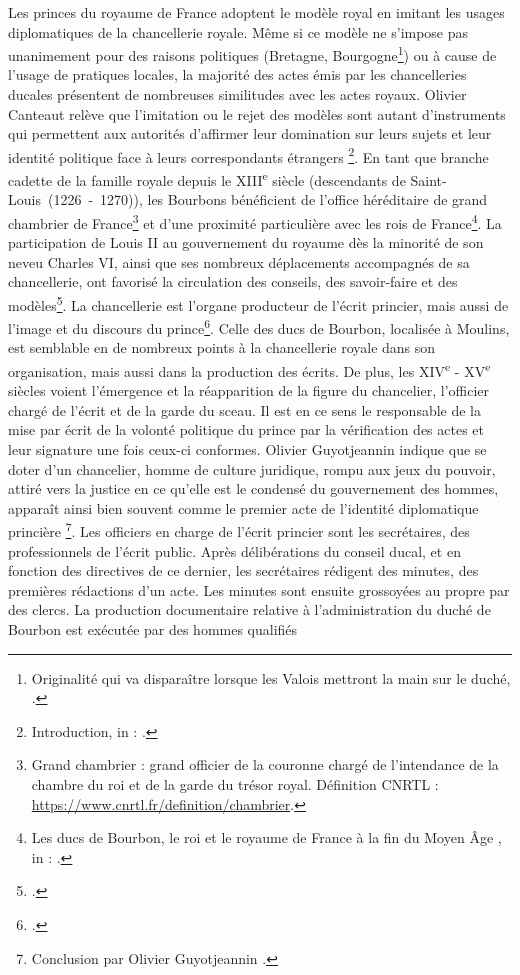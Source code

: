 \par Les princes du royaume de France adoptent le modèle royal en imitant les usages diplomatiques de la chancellerie royale. Même si ce modèle ne s’impose pas unanimement pour des raisons politiques (Bretagne, Bourgogne\footnote{Originalité qui va disparaître lorsque les Valois mettront la main sur le duché,  \cite{courtelChancellerieActesEudes1977}.}) ou à cause de l'usage de pratiques locales, la majorité des actes émis par les chancelleries ducales présentent de nombreuses similitudes avec les actes royaux. Olivier Canteaut relève que \og l'imitation ou le rejet des modèles sont autant d'instruments qui permettent aux autorités d’affirmer leur domination sur leurs sujets et leur identité politique face à leurs correspondants étrangers \fg\footnote{\og Introduction\fg, in : \cite{canteautDiscretLangagePouvoir2019}.}. En tant que branche cadette de la famille royale depuis le \textsc{XIII}\textsuperscript{e} siècle (descendants de Saint-Louis~(1226~-~1270)), les Bourbons bénéficient de l'office héréditaire de grand chambrier de France\footnote{Grand chambrier : grand officier de la couronne chargé de l'intendance de la chambre du roi et de la garde du trésor royal. Définition CNRTL : \url{https://www.cnrtl.fr/definition/chambrier}.} et d'une proximité particulière avec les rois de France\footnote{\og Les ducs de Bourbon, le roi et le royaume de France à la fin du Moyen Âge \fg, in : \cite{matteoniBourbonsLeurBibliotheque2022}.}. La participation de Louis II au gouvernement du royaume dès la minorité de son neveu Charles VI, ainsi que ses nombreux déplacements accompagnés de sa chancellerie, ont favorisé la circulation des conseils, des savoir-faire et des modèles\footnote{\cite{matteoniEcriturePouvoirPrincier2011}.}. La chancellerie est l’organe producteur de l'écrit princier, mais aussi de l'image et du discours du prince\footnote{\cite{generoChancellerieCharlesIer2018}.}. Celle des ducs de Bourbon, localisée à Moulins, est semblable en de nombreux points à la chancellerie royale dans son organisation, mais aussi dans la production des écrits. De plus, les \textsc{XIV}\textsuperscript{e} - \textsc{XV}\textsuperscript{e} siècles voient l'émergence et la réapparition de la figure du chancelier, l'officier chargé de l'écrit et de la garde du sceau. Il est en ce sens le responsable de la mise par écrit de la volonté politique du prince par la vérification des actes et leur signature une fois ceux-ci conformes. Olivier Guyotjeannin indique que \og se doter d’un chancelier, homme de culture juridique, rompu aux jeux du pouvoir, attiré vers la justice en ce qu’elle est le condensé du gouvernement des hommes, apparaît ainsi bien souvent comme le premier acte de l’identité diplomatique princière \fg\footnote{Conclusion par Olivier Guyotjeannin \cite{matteoniEcriturePouvoirPrincier2011}.}. Les officiers en charge de l'écrit princier sont les secrétaires, des professionnels de l'écrit public. Après délibérations du conseil ducal, et en fonction des directives de ce dernier, les secrétaires rédigent des minutes, des premières rédactions d'un acte. Les minutes sont ensuite grossoyées au propre par des clercs. La production documentaire relative à l'administration du duché de Bourbon est exécutée par des hommes qualifiés 